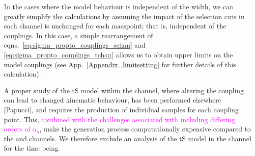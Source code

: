 In the cases where the model behaviour is independent of the width, we can greatly simplify the calculations by assuming the impact of the selection cuts in each channel is unchanged for each masspoint; that is, independent of the couplings. In this case, a simple rearrangement of eqns.~\ref{eq:sigma_propto_couplings_schan} and \ref{eq:sigma_propto_couplings_tchan} allows us to obtain upper limits on the model couplings (see App.~\ref{Appendix_limitsetting} for further details of this calculation).

A proper study of the tS model within the \monojet channel, where altering the coupling can lead to changed kinematic behaviour, has been performed elsewhere [Papucci], and requires the production of individual samples for each coupling point. This, \textcolor{magenta}{combined with the challenges associated with including differing orders of $\alpha_s$}, make the generation process computationally expensive compared to the \monoZ and \monoWZ channels. We therefore exclude an analysis of the tS model in the \monojet channel for the time being.



